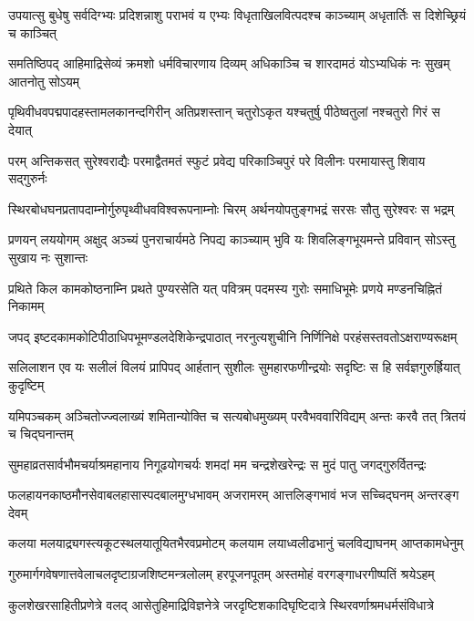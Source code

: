 \twolineshloka
{उपयात्सु बुधेषु सर्वदिग्भ्यः प्रदिशन्नाशु पराभवं य एभ्यः}
{विधृताखिलवित्पदश्च काञ्च्याम् अधृतार्तिः स दिशेच्छ्रियं च काञ्चित्}%

\twolineshloka
{समतिष्ठिपद् आहिमाद्रिसेव्यं क्रमशो धर्मविचारणाय दिव्यम्}
{अधिकाञ्चि च शारदामठं योऽभ्यधिकं नः सुखम् आतनोतु सोऽयम्}%

\twolineshloka
{पृथिवीधवपद्मपादहस्तामलकानन्दगिरीन् अतिप्रशस्तान्}
{चतुरोऽकृत यश्चतुर्षु पीठेष्वतुलां नश्चतुरो गिरं स देयात्}%

\twolineshloka
{परम् अन्तिकसत् सुरेश्वराद्यैः परमाद्वैतमतं स्फुटं प्रवेद्य}
{परिकाञ्चिपुरं परे विलीनः परमायास्तु शिवाय सद्गुरुर्नः}%

\twolineshloka
{स्थिरबोधघनप्रतापदाम्नोर्गुरुपृथ्वीधवविश्वरूपनाम्नोः}
{चिरम् अर्थनयोपतुङ्गभद्रं सरसः सौतु सुरेश्वरः स भद्रम्}%

\twolineshloka
{प्रणयन् लययोगम् अक्षुद् अञ्च्यं पुनराचार्यमठे निपद्य काञ्च्याम्}
{भुवि यः शिवलिङ्गभूयमन्ते प्रविवान् सोऽस्तु सुखाय नः सुशान्तः}%

\twolineshloka
{प्रथिते किल कामकोष्ठनाम्नि प्रथते पुण्यरसेति यत् पवित्रम्}
{पदमस्य गुरोः समाधिभूमेः प्रणये मण्डनचिह्नितं निकामम्}%

\twolineshloka
{जपद् इष्टदकामकोटिपीठाधिपभूमण्डलदेशिकेन्द्रपाठात्}
{नरनुत्यशुचीनि निर्णिनिक्षे परहंसस्तवतोऽक्षराण्यरूक्षम्}%

\twolineshloka
{सलिलाशन एव यः सलीलं विलयं प्रापिपद् आर्हतान् सुशीलः}
{सुमहारफणीन्द्रयोः सदृष्टिः स हि सर्वज्ञगुरुर्ह्रियात् कुदृष्टिम्}%

\twolineshloka
{यमिपञ्चकम् अञ्चितोज्ज्वलाख्यं शमितान्योक्ति च सत्यबोधमुख्यम्}
{परवैभववारिविद्यम् अन्तः करवै तत् त्रितयं च चिद्घनान्तम्}%

\twolineshloka
{सुमहाव्रतसार्वभौमचर्याश्रमहानाय निगूढयोगचर्यः}
{शमदां मम चन्द्रशेखरेन्द्रः स मुदं पातु जगद्गुरुर्वितन्द्रः}%

\twolineshloka
{फलहायनकाष्ठमौनसेवाबलहासास्पदबालमुग्धभावम्}
{अजरामरम् आत्तलिङ्गभावं भज सच्चिद्घनम् अन्तरङ्ग देवम्}%

\twolineshloka
{कलया मलयाद्र्यगस्त्यकूटस्थलयातूयितभैरवप्रमोटम्}
{कलयाम लयाध्वलीढभानुं चलविद्याघनम् आप्तकामधेनुम्}%

\twolineshloka
{गुरुमार्गगवेषणात्तवेलाचलदृष्टाग्रजशिष्टमन्त्रलोलम्}
{हरपूजनपूतम् अस्तमोहं वरगङ्गाधरगीष्पतिं श्रयेऽहम्}%

\twolineshloka
{कुलशेखरसाहितीप्रणेत्रे वलद् आसेतुहिमाद्रिविज्ञनेत्रे}
{जरदृष्टिशकादिघृष्टिदात्रे स्थिरवर्णाश्रमधर्मसंविधात्रे}%

